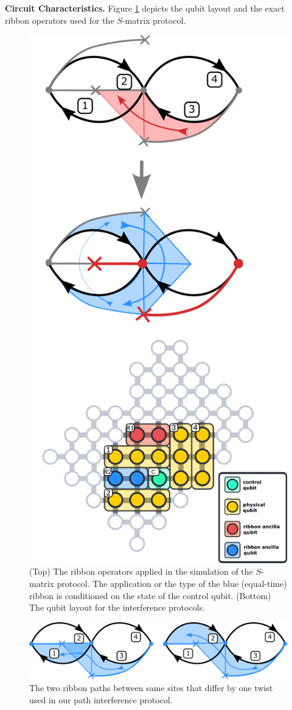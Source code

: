 \documentclass[two column]{article}
\begin{document}
\textbf{Circuit Characteristics.}
Figure \ref{fig:intef_setup} depicts the qubit layout and the exact ribbon operators used for the $S$-matrix protocol.
\begin{figure}
	\centering
	\includegraphics[width=0.75\linewidth]{Figures/intef_setup_new.pdf}
	\caption{(Top) The ribbon operators applied in the simulation of the $S$-matrix protocol. The application or the type of the blue (equal-time) ribbon is conditioned on the state of the control qubit. (Bottom) The qubit layout for the interference protocols.}
	\label{fig:intef_setup}
\end{figure}
\begin{figure}
	\centering
	\includegraphics[width=\linewidth]{Figures/t-mat_ribs.pdf}
	\caption{The two ribbon paths between same sites that differ by one twist used in our path interference protocol.}
	\label{fig:T_intef_setup}
\end{figure}
\end{document}
